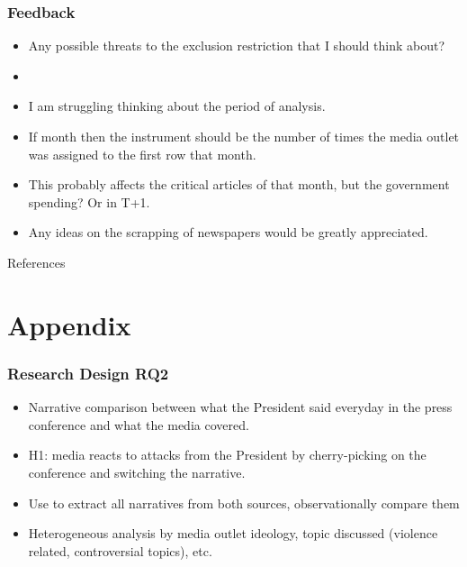 \documentclass[12pt]{beamer}
\begin{document}
\begin{frame}
\frametitle{Feedback}

\small
\begin{itemize}
    \item Any possible threats to the exclusion restriction that I should think about?
    \item 
    \item I am struggling thinking about the period of analysis. 
    \item If month then the instrument should be the number of times the media outlet was assigned to the first row that month. 
    \item This probably affects the critical articles of that month, but the government spending? Or in T+1.

    \item Any ideas on the scrapping of newspapers would be greatly appreciated.

\end{itemize}
\end{frame}




\begin{frame}{References}
\scriptsize
    
    \typeout{}

    \singlespacing

    
    
\end{frame}

\section{Appendix}

\begin{frame}
\frametitle{Research Design RQ2}

\small
\begin{itemize}
\item Narrative comparison between what the President said everyday in the press conference and what the media covered.
\item H1: media reacts to attacks from the President by cherry-picking on the conference and switching the narrative.

\item Use \cite{QNarr-Waight-WP} to extract all narratives from both sources, observationally compare them

\item Heterogeneous analysis by media outlet ideology, topic discussed (violence related, controversial topics), etc.

\end{itemize}
\end{frame}
\end{document}
